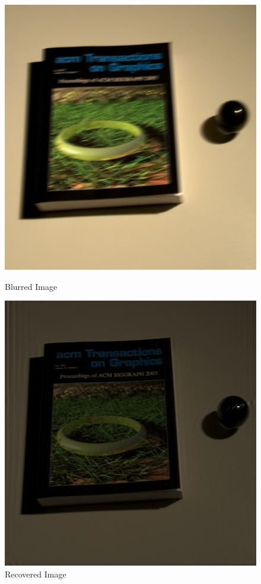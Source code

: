 \documentclass{article}
\begin{document}
    \begin{figure}[!htb]
      \includegraphics[scale=1.25]{./real_world/shan/shan.png}
      \caption{Blurred Image}
    \endminipage\hfill
      \includegraphics[scale=0.3]{./real_world/shan/5.png}
      \caption{Recovered Image}
    \endminipage\hfill
    \end{figure}
    \pagebreak
\end{document}
